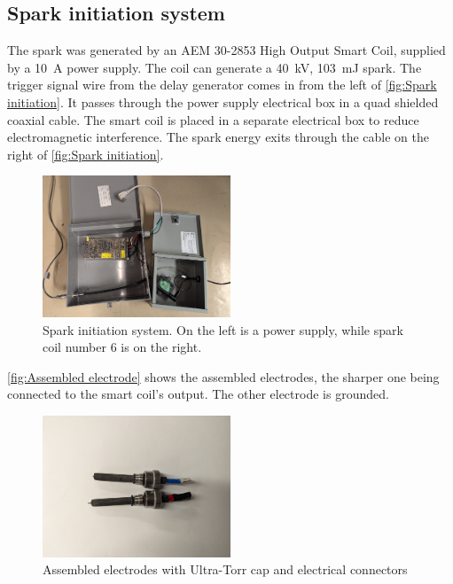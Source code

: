         \subsection{Spark initiation system}

            The spark was generated by an AEM 30-2853 High Output Smart Coil, supplied by a \qty{10}{A} power supply. The coil can generate a \qty{40}{kV}, \qty{103}{mJ} spark. The trigger signal wire from the delay generator comes in from the left of \autoref{fig:Spark initiation}. It passes through the power supply electrical box in a quad shielded coaxial cable. The smart coil is placed in a separate electrical box to reduce electromagnetic interference. The spark energy exits through the cable on the right of \autoref{fig:Spark initiation}. 

            \begin{figure}[!ht]
                \centering
                \includegraphics[width=0.50\textwidth]{assets/3 design/Spark initiation system.jpg}
                \caption{Spark initiation system. On the left is a power supply, while spark coil number 6 is on the right.}
                \label{fig:Spark initiation}
            \end{figure}

            \autoref{fig:Assembled electrode} shows the assembled electrodes, the sharper one being connected to the smart coil's output. The other electrode is grounded.

            \begin{figure}[!ht]
                \centering
                \includegraphics[width=0.5\textwidth]{assets/3 design/V2 electrodes.jpg}
                \caption{Assembled electrodes with Ultra-Torr cap and electrical connectors}
                \label{fig:Assembled electrode}
            \end{figure}

